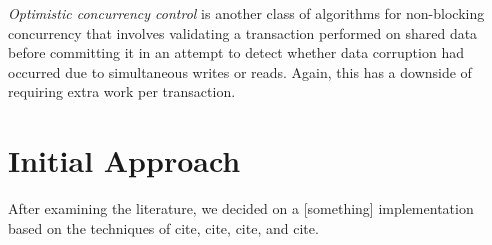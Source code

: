 \documentclass[11pt, a4paper, twocolumn]{article}
\begin{document}
\emph{Optimistic concurrency control} is another class of algorithms for non-blocking concurrency that involves validating a transaction performed on shared data before committing it \citep{Herlihy1993} in an attempt to detect whether data corruption had occurred due to simultaneous writes or reads. Again, this has a downside of requiring extra work per transaction.



\section{Initial Approach}

After examining the literature, we decided on a [something] implementation based on the techniques of cite, cite, cite, and cite.





\end{document}
